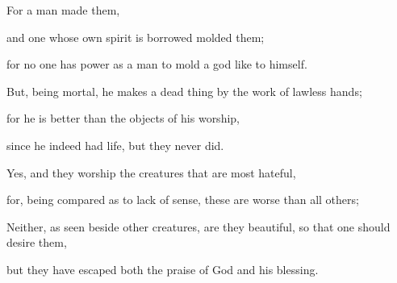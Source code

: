 {\par }{\Q {}For a man made them,
\par }{\QB and one whose own spirit is borrowed molded them;
\par }{\QB for no one has power as a man to mold a god like to himself.
\par }{\Q {}But, being mortal, he makes a dead thing by the work of lawless hands;
\par }{\QB for he is better than the objects of his worship,
\par }{\QB since he indeed had life, but they never did.
\par }{\BB \par }{\Q {}Yes, and they worship the creatures that are most hateful,
\par }{\QB for, being compared as to lack of sense, these are worse than all others;
\par }{\Q {}Neither, as seen beside other creatures, are they beautiful, so that one should desire them,
\par }{\QB but they have escaped both the praise of God and his blessing.

}
